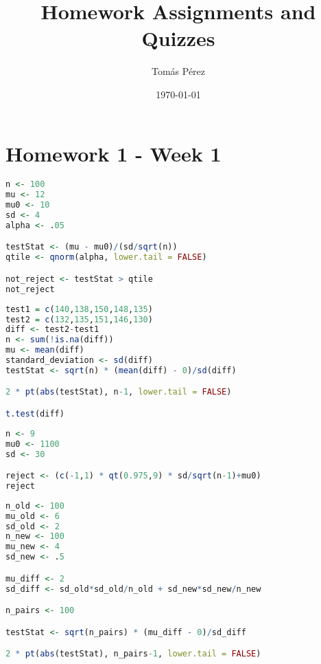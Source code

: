 \documentclass{homework}
\author{Tomás Pérez}
\date{\today}
\title{Homework Assignments and Quizzes}
\begin{document}
 \maketitle

\section{Homework 1 - Week 1}

\begin{tcolorbox}[title=Question 1]
\end{tcolorbox}

\begin{lstlisting}[language=R]
n <- 100
mu <- 12
mu0 <- 10 
sd <- 4
alpha <- .05

testStat <- (mu - mu0)/(sd/sqrt(n))
qtile <- qnorm(alpha, lower.tail = FALSE)

not_reject <- testStat > qtile 
not_reject
\end{lstlisting}

\begin{tcolorbox}[title=Question 2]
\end{tcolorbox}

\begin{lstlisting}[language=R]
test1 = c(140,138,150,148,135)
test2 = c(132,135,151,146,130)
diff <- test2-test1
n <- sum(!is.na(diff))
mu <- mean(diff)
standard_deviation <- sd(diff)
testStat <- sqrt(n) * (mean(diff) - 0)/sd(diff)

2 * pt(abs(testStat), n-1, lower.tail = FALSE) 

t.test(diff)
\end{lstlisting}

\begin{tcolorbox}[title=Question 3]
\end{tcolorbox}

\begin{lstlisting}[language=R]
n <- 9
mu0 <- 1100
sd <- 30

reject <- (c(-1,1) * qt(0.975,9) * sd/sqrt(n-1)+mu0)
reject
\end{lstlisting}

\begin{tcolorbox}[title=Question 4]
\end{tcolorbox}

\begin{lstlisting}[language=R]
n_old <- 100
mu_old <- 6
sd_old <- 2 
n_new <- 100
mu_new <- 4
sd_new <- .5

mu_diff <- 2 
sd_diff <- sd_old*sd_old/n_old + sd_new*sd_new/n_new

n_pairs <- 100

testStat <- sqrt(n_pairs) * (mu_diff - 0)/sd_diff

2 * pt(abs(testStat), n_pairs-1, lower.tail = FALSE) 
\end{lstlisting}
\end{document}
